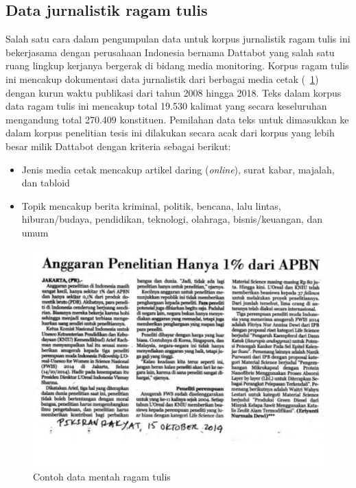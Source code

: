 \subsection{Data jurnalistik ragam tulis}
Salah satu cara dalam pengumpulan data untuk korpus jurnalistik ragam tulis ini bekerjasama dengan perusahaan Indonesia bernama Dattabot yang salah satu ruang lingkup kerjanya bergerak di bidang media monitoring. Korpus ragam tulis ini mencakup dokumentasi data jurnalistik dari berbagai media cetak (\pic~\ref{fig:contoh-tulis-mentah}) dengan kurun waktu publikasi dari tahun 2008 hingga 2018. Teks dalam korpus data ragam tulis ini mencakup total 19.530 kalimat yang secara keseluruhan mengandung total 270.409 konstituen. Pemilahan data teks untuk dimasukkan ke dalam korpus penelitian tesis ini dilakukan secara acak dari korpus yang lebih besar milik Dattabot dengan kriteria sebagai berikut:

\begin{itemize}
	\item Jenis media cetak mencakup artikel daring (\textit{online}), surat kabar, majalah, dan tabloid
	\item Topik mencakup berita kriminal, politik, bencana, lalu lintas, hiburan/budaya, pendidikan, teknologi, olahraga, bisnis/keuangan, dan umum
\end{itemize}

\begin{figure}
	\centering \includegraphics[width=1
	\textwidth] {pics/contoh-tulis-mentah.png} \caption{Contoh data mentah ragam tulis} 
\label{fig:contoh-tulis-mentah} 
\end{figure}

